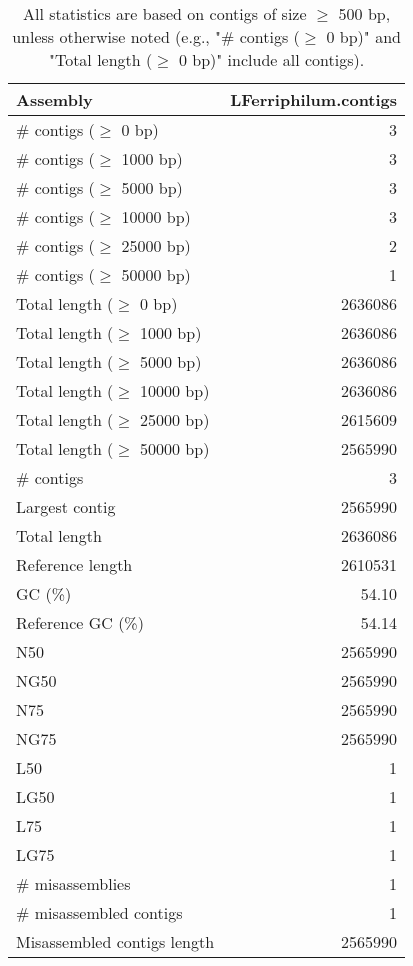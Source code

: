 \documentclass[12pt,a4paper]{article}
\begin{document}
\begin{table}[ht]
\begin{center}
\caption{All statistics are based on contigs of size $\geq$ 500 bp, unless otherwise noted (e.g., "\# contigs ($\geq$ 0 bp)" and "Total length ($\geq$ 0 bp)" include all contigs).}
\begin{tabular}{|l*{1}{|r}|}
\hline
Assembly & LFerriphilum.contigs \\ \hline
\# contigs ($\geq$ 0 bp) & 3 \\ \hline
\# contigs ($\geq$ 1000 bp) & 3 \\ \hline
\# contigs ($\geq$ 5000 bp) & 3 \\ \hline
\# contigs ($\geq$ 10000 bp) & 3 \\ \hline
\# contigs ($\geq$ 25000 bp) & 2 \\ \hline
\# contigs ($\geq$ 50000 bp) & 1 \\ \hline
Total length ($\geq$ 0 bp) & 2636086 \\ \hline
Total length ($\geq$ 1000 bp) & 2636086 \\ \hline
Total length ($\geq$ 5000 bp) & 2636086 \\ \hline
Total length ($\geq$ 10000 bp) & 2636086 \\ \hline
Total length ($\geq$ 25000 bp) & 2615609 \\ \hline
Total length ($\geq$ 50000 bp) & 2565990 \\ \hline
\# contigs & 3 \\ \hline
Largest contig & 2565990 \\ \hline
Total length & 2636086 \\ \hline
Reference length & 2610531 \\ \hline
GC (\%) & 54.10 \\ \hline
Reference GC (\%) & 54.14 \\ \hline
N50 & 2565990 \\ \hline
NG50 & 2565990 \\ \hline
N75 & 2565990 \\ \hline
NG75 & 2565990 \\ \hline
L50 & 1 \\ \hline
LG50 & 1 \\ \hline
L75 & 1 \\ \hline
LG75 & 1 \\ \hline
\# misassemblies & 1 \\ \hline
\# misassembled contigs & 1 \\ \hline
Misassembled contigs length & 2565990 \\ \hline

\end{tabular}
\end{center}
\end{table}
\end{document}
